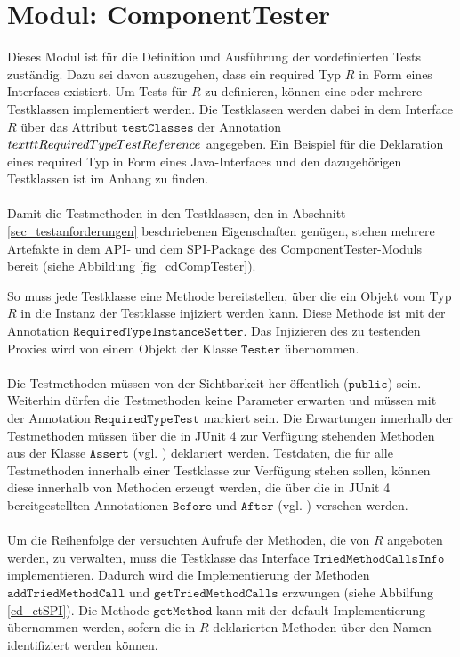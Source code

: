 \section{Modul: ComponentTester}
Dieses Modul ist für die Definition und Ausführung der vordefinierten Tests zuständig. Dazu sei davon auszugehen, dass ein required Typ $R$ in Form eines Interfaces existiert. Um Tests für $R$ zu definieren, können eine oder mehrere Testklassen implementiert werden. Die Testklassen werden dabei in dem Interface $R$ über das Attribut $\texttt{testClasses}$ der Annotation $\\texttt{RequiredTypeTestReference}$ angegeben. Ein Beispiel für die Deklaration eines required Typ in Form eines Java-Interfaces und den dazugehörigen Testklassen ist im Anhang zu finden.
\\\\
Damit die Testmethoden in den Testklassen, den in Abschnitt \ref{sec_testanforderungen} beschriebenen Eigenschaften genügen, stehen mehrere Artefakte in dem API- und dem SPI-Package des ComponentTester-Moduls bereit (siehe Abbildung \ref{fig_cdCompTester}).
\begin{figure}

\end{figure}\label{fig_cdCompTester}
\noindent
So muss jede Testklasse eine Methode bereitstellen, über die ein Objekt vom Typ $R$ in die Instanz der Testklasse injiziert werden kann. Diese Methode ist mit der Annotation $\texttt{RequiredTypeInstanceSetter}$. Das Injizieren des zu testenden Proxies wird von einem Objekt der Klasse $\texttt{Tester}$ übernommen.
\\\\
Die Testmethoden müssen von der Sichtbarkeit her öffentlich ($\texttt{public}$) sein. Weiterhin dürfen die Testmethoden keine Parameter erwarten und müssen mit der Annotation $\texttt{RequiredTypeTest}$ markiert sein. Die Erwartungen innerhalb der Testmethoden müssen über die in JUnit 4 zur Verfügung stehenden Methoden aus der Klasse $\texttt{Assert}$ (vgl. \cite{junit_api}) deklariert werden. Testdaten, die für alle Testmethoden innerhalb einer Testklasse zur Verfügung stehen sollen, können diese innerhalb von Methoden erzeugt werden, die über die in JUnit 4 bereitgestellten Annotationen $\texttt{Before}$ und $\texttt{After}$ (vgl. \cite{junit_api}) versehen werden.
\\\\
Um die Reihenfolge der versuchten Aufrufe der Methoden, die von $R$ angeboten werden, zu verwalten, muss die Testklasse das Interface $\texttt{TriedMethodCallsInfo}$ implementieren. Dadurch wird die Implementierung der Methoden $\texttt{addTriedMethodCall}$ und $\texttt{getTriedMethodCalls}$ erzwungen (siehe Abbilfung \ref{cd_ctSPI}). Die Methode $\texttt{getMethod}$ kann mit der default-Implementierung übernommen werden, sofern die in $R$ deklarierten Methoden über den Namen identifiziert werden können.
